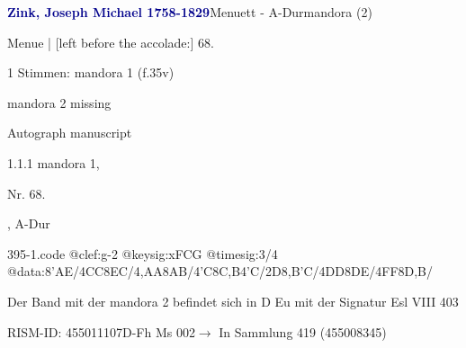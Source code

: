 \documentclass[twocolumn, 12pt]{book}
\begin{document}
\par \vspace{16pt} \textcolor{darkblue}{\textbf{Zink, Joseph Michael  1758-1829}}\hfillplus{\textbf{[395]}}\newline Menuett - A-Dur\newline mandora (2)
\par \begin{itshape}[f.35v, at left:] Menue | [left before the accolade:] 68.\end{itshape} 
\par \textcolor{darkblue}{}  1 Stimmen: mandora 1  (f.35v)\newline \begin{small} mandora 2 missing\end{small} \newline Autograph manuscript
\par 1.1.1  mandora 1, \begin{itshape}Nr. 68.\end{itshape}, A-Dur  
\begin{filecontents*}{395-1.code}
@clef:g-2
@keysig:xFCG
@timesig:3/4
@data:{8'AE}/4CC{8EC}/4,AA{8AB}/4'C{8C,B}4'C/2D{8,B'C}/4DD{8DE}/4FF{8D,B}/
\end{filecontents*}
\newline %
\par Der Band mit der mandora 2 befindet sich in D Eu mit der Signatur Esl VIII 403
\par RISM-ID: 455011107\newline D-Fh  Ms 002\newline $\rightarrow$ In Sammlung 419 (455008345)
      
\end{document}
